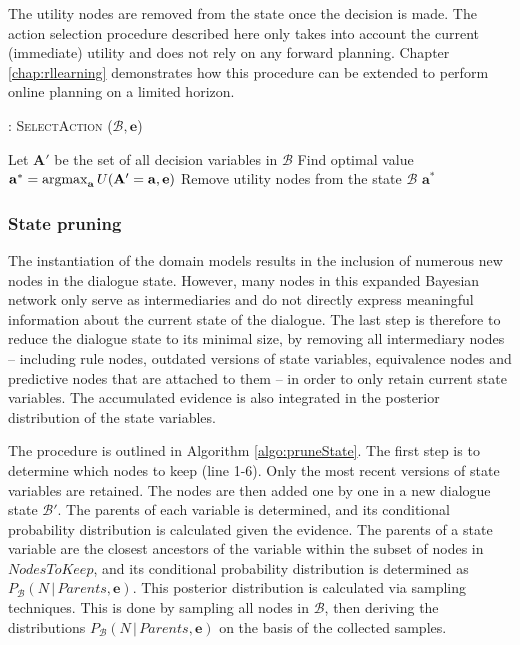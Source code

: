 The utility nodes are removed from the state once the decision is made. The action selection procedure described here only takes into account the current (immediate) utility and does not rely on any forward planning.  Chapter \ref{chap:rllearning} demonstrates how this procedure can be extended to perform online planning on a limited horizon.  \\

\begin{algorithm}[h]
\caption{: \textsc{SelectAction} ($\mathcal{B}, \mathbf{e}$)}
\begin{algorithmic}[1] \vspace{1mm}
\STATE Let $\mathbf{A}'$ be the set of all decision variables in $\mathcal{B}$
\STATE Find optimal value $\mathbf{a}^* = \argmax_{\mathbf{a}} U(\mathbf{A}' = \mathbf{a}, \mathbf{e})$
\STATE Remove utility nodes from the state $\mathcal{B}$
\RETURN $\mathbf{a}^*$
\end{algorithmic}
\label{algo:actionselection}
\end{algorithm}


\subsubsection*{State pruning}

The instantiation of the domain models results in the inclusion of numerous new nodes in the dialogue state. However, many nodes in this expanded Bayesian network  only serve as intermediaries and do not directly express meaningful information about the current state of the dialogue. The last step is therefore to reduce the dialogue state to its minimal size, by removing all intermediary nodes -- including rule nodes, outdated versions of state variables, equivalence nodes and predictive nodes that are attached to them -- in order to only retain current state variables. The accumulated evidence is also integrated in the posterior distribution of the state variables.

The procedure is outlined in Algorithm \ref{algo:pruneState}. The first step is to determine which nodes to keep (line 1-6).  Only the most recent versions of state variables are retained. 
The nodes are then added one by one in a new dialogue state $\mathcal{B}'$.  The parents of each variable is determined, and its conditional probability distribution is calculated given the evidence.  The parents of a state variable are the closest ancestors of the variable within the subset of nodes in $\mathit{NodesToKeep}$, and its conditional probability distribution is determined as $P_{\mathcal{B}}(N \, | \, \mathit{Parents}, \mathbf{e})$.  This posterior distribution is calculated via sampling techniques. This is done by sampling all nodes in $\mathcal{B}$, then deriving the distributions $P_{\mathcal{B}}(N \, | \, \mathit{Parents}, \mathbf{e})$ on the basis of the collected samples. 

